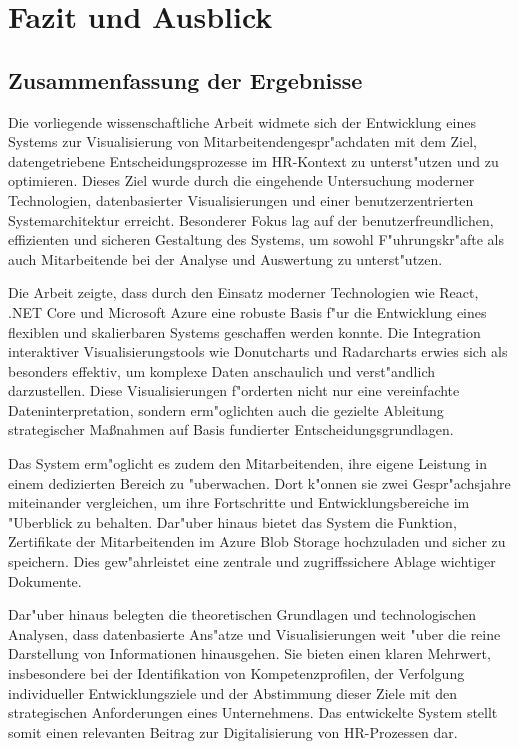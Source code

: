\chapter{Fazit und Ausblick} 
\label{chap:fazit}

\section{Zusammenfassung der Ergebnisse}
Die vorliegende wissenschaftliche Arbeit widmete sich der Entwicklung eines Systems zur Visualisierung von Mitarbeitendengespr"achdaten mit dem Ziel, datengetriebene Entscheidungsprozesse im HR-Kontext zu unterst"utzen und zu optimieren. Dieses Ziel wurde durch die eingehende Untersuchung moderner Technologien, datenbasierter Visualisierungen und einer benutzerzentrierten Systemarchitektur erreicht. Besonderer Fokus lag auf der benutzerfreundlichen, effizienten und sicheren Gestaltung des Systems, um sowohl F"uhrungskr"afte als auch Mitarbeitende bei der Analyse und Auswertung zu unterst"utzen.

Die Arbeit zeigte, dass durch den Einsatz moderner Technologien wie React, .NET Core und Microsoft Azure eine robuste Basis f"ur die Entwicklung eines flexiblen und skalierbaren Systems geschaffen werden konnte. Die Integration interaktiver Visualisierungstools wie Donutcharts und Radarcharts erwies sich als besonders effektiv, um komplexe Daten anschaulich und verst"andlich darzustellen. Diese Visualisierungen f"orderten nicht nur eine vereinfachte Dateninterpretation, sondern erm"oglichten auch die gezielte Ableitung strategischer Ma\ss nahmen auf Basis fundierter Entscheidungsgrundlagen. 

Das System erm"oglicht es zudem den Mitarbeitenden, ihre eigene Leistung in einem dedizierten Bereich zu "uberwachen. Dort k"onnen sie zwei Gespr"achsjahre miteinander vergleichen, um ihre Fortschritte und Entwicklungsbereiche im "Uberblick zu behalten. Dar"uber hinaus bietet das System die Funktion, Zertifikate der Mitarbeitenden im Azure Blob Storage hochzuladen und sicher zu speichern. Dies gew"ahrleistet eine zentrale und zugriffssichere Ablage wichtiger Dokumente.

Dar"uber hinaus belegten die theoretischen Grundlagen und technologischen Analysen, dass datenbasierte Ans"atze und Visualisierungen weit "uber die reine Darstellung von Informationen hinausgehen. Sie bieten einen klaren Mehrwert, insbesondere bei der Identifikation von Kompetenzprofilen, der Verfolgung individueller Entwicklungsziele und der Abstimmung dieser Ziele mit den strategischen Anforderungen eines Unternehmens. Das entwickelte System stellt somit einen relevanten Beitrag zur Digitalisierung von HR-Prozessen dar.

